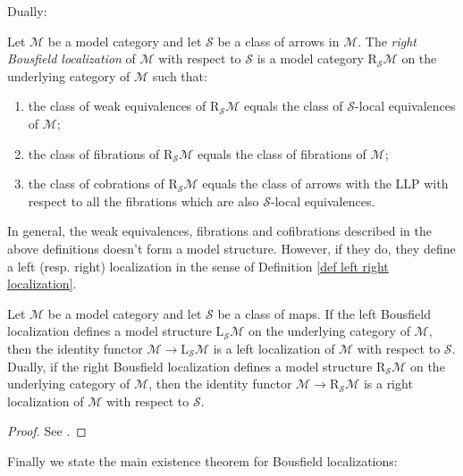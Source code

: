 \begin{refsection}
Dually:

\begin{defin}
Let $\mathcal M$ be a model category and let $\mathcal S$ be a class of arrows in $\mathcal M$. The \emph{right Bousfield localization} of $\mathcal M$ with respect to $\mathcal S$ is a model category $\mathrm R_{\mathcal S} \mathcal M$ on the underlying category of $\mathcal M$ such that:
\begin{enumerate}
\item the class of weak equivalences of $\mathrm R_{\mathcal S} \mathcal M$ equals the class of $\mathcal S$-local equivalences of $\mathcal M$;
\item the class of fibrations of $\mathrm R_{\mathcal S} \mathcal M$ equals the class of fibrations of $\mathcal M$;
\item the class of cobrations of $\mathrm R_{\mathcal S} \mathcal M$ equals the class of arrows with the LLP with respect to all the fibrations which are also $\mathcal S$-local equivalences.
\end{enumerate}
\end{defin}

In general, the weak equivalences, fibrations and cofibrations described in the above definitions doesn't form a model structure. However, if they do, they define a left (resp. right) localization in the sense of Definition \ref{def left right localization}.

\begin{thm}
Let $\mathcal M$ be a model category and let $\mathcal S$ be a class of maps. If the left Bousfield localization defines a model structure $\mathrm L_{\mathcal S} \mathcal M$ on the underlying category of $\mathcal M$, then the identity functor $\mathcal M \to \mathrm L_{\mathcal S} \mathcal M$ is a left localization of $\mathcal M$ with respect to $\mathcal S$. Dually, if the right Bousfield localization defines a model structure $\mathrm R_{\mathcal S} \mathcal M$ on the underlying category of $\mathcal M$, then the identity functor $\mathcal M \to \mathrm R_{\mathcal S} \mathcal M$ is a right localization of $\mathcal M$ with respect to $\mathcal S$.
\end{thm}

\begin{proof}
See \cite[Theorem 3.3.19]{hirschhorn}.
\end{proof}

Finally we state the main existence theorem for Bousfield localizations:


\end{refsection}
